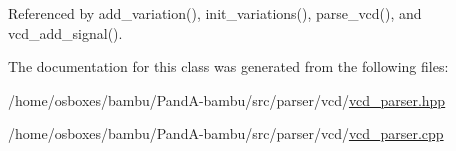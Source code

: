 Referenced by add\+\_\+variation(), init\+\_\+variations(), parse\+\_\+vcd(), and vcd\+\_\+add\+\_\+signal().



The documentation for this class was generated from the following files\+:\begin{DoxyCompactItemize}
\item 
/home/osboxes/bambu/\+Pand\+A-\/bambu/src/parser/vcd/\hyperlink{vcd__parser_8hpp}{vcd\+\_\+parser.\+hpp}\item 
/home/osboxes/bambu/\+Pand\+A-\/bambu/src/parser/vcd/\hyperlink{vcd__parser_8cpp}{vcd\+\_\+parser.\+cpp}\end{DoxyCompactItemize}
